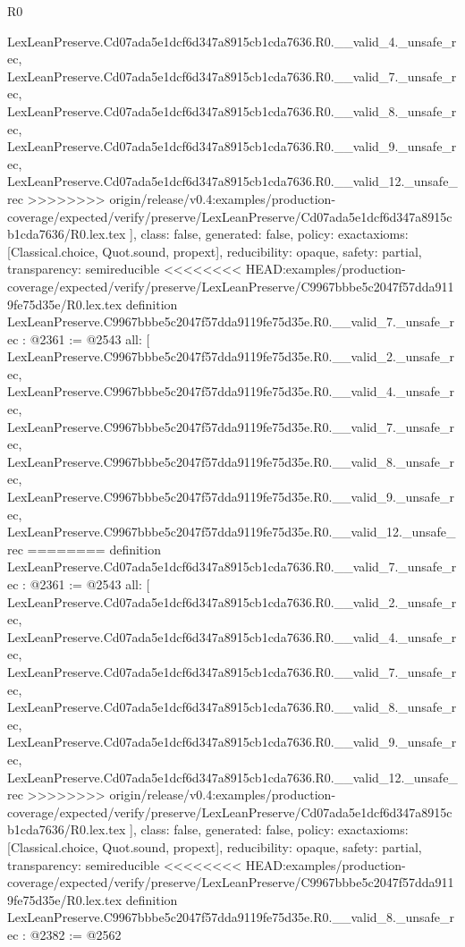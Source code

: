 \begin{lexlean}{R0}
\begin{coremodule}
{{{{{{{{{{{{{{{{{{{{{{{{{{{{{{{{{{{{{{{{{{{{{{{{{{{{    LexLeanPreserve.Cd07ada5e1dcf6d347a8915cb1cda7636.R0.__valid_4._unsafe_rec,
    LexLeanPreserve.Cd07ada5e1dcf6d347a8915cb1cda7636.R0.__valid_7._unsafe_rec,
    LexLeanPreserve.Cd07ada5e1dcf6d347a8915cb1cda7636.R0.__valid_8._unsafe_rec,
    LexLeanPreserve.Cd07ada5e1dcf6d347a8915cb1cda7636.R0.__valid_9._unsafe_rec,
    LexLeanPreserve.Cd07ada5e1dcf6d347a8915cb1cda7636.R0.__valid_12._unsafe_rec
>>>>>>>> origin/release/v0.4:examples/production-coverage/expected/verify/preserve/LexLeanPreserve/Cd07ada5e1dcf6d347a8915cb1cda7636/R0.lex.tex
  ],
  class: false,
  generated: false,
  policy: exact{axioms: [Classical.choice, Quot.sound, propext]},
  reducibility: opaque{},
  safety: partial,
  transparency: semireducible
}
<<<<<<<< HEAD:examples/production-coverage/expected/verify/preserve/LexLeanPreserve/C9967bbbe5c2047f57dda9119fe75d35e/R0.lex.tex
definition LexLeanPreserve.C9967bbbe5c2047f57dda9119fe75d35e.R0.__valid_7._unsafe_rec : @2361 := @2543 {
  all: [
    LexLeanPreserve.C9967bbbe5c2047f57dda9119fe75d35e.R0.__valid_2._unsafe_rec,
    LexLeanPreserve.C9967bbbe5c2047f57dda9119fe75d35e.R0.__valid_4._unsafe_rec,
    LexLeanPreserve.C9967bbbe5c2047f57dda9119fe75d35e.R0.__valid_7._unsafe_rec,
    LexLeanPreserve.C9967bbbe5c2047f57dda9119fe75d35e.R0.__valid_8._unsafe_rec,
    LexLeanPreserve.C9967bbbe5c2047f57dda9119fe75d35e.R0.__valid_9._unsafe_rec,
    LexLeanPreserve.C9967bbbe5c2047f57dda9119fe75d35e.R0.__valid_12._unsafe_rec
========
definition LexLeanPreserve.Cd07ada5e1dcf6d347a8915cb1cda7636.R0.__valid_7._unsafe_rec : @2361 := @2543 {
  all: [
    LexLeanPreserve.Cd07ada5e1dcf6d347a8915cb1cda7636.R0.__valid_2._unsafe_rec,
    LexLeanPreserve.Cd07ada5e1dcf6d347a8915cb1cda7636.R0.__valid_4._unsafe_rec,
    LexLeanPreserve.Cd07ada5e1dcf6d347a8915cb1cda7636.R0.__valid_7._unsafe_rec,
    LexLeanPreserve.Cd07ada5e1dcf6d347a8915cb1cda7636.R0.__valid_8._unsafe_rec,
    LexLeanPreserve.Cd07ada5e1dcf6d347a8915cb1cda7636.R0.__valid_9._unsafe_rec,
    LexLeanPreserve.Cd07ada5e1dcf6d347a8915cb1cda7636.R0.__valid_12._unsafe_rec
>>>>>>>> origin/release/v0.4:examples/production-coverage/expected/verify/preserve/LexLeanPreserve/Cd07ada5e1dcf6d347a8915cb1cda7636/R0.lex.tex
  ],
  class: false,
  generated: false,
  policy: exact{axioms: [Classical.choice, Quot.sound, propext]},
  reducibility: opaque{},
  safety: partial,
  transparency: semireducible
}
<<<<<<<< HEAD:examples/production-coverage/expected/verify/preserve/LexLeanPreserve/C9967bbbe5c2047f57dda9119fe75d35e/R0.lex.tex
definition LexLeanPreserve.C9967bbbe5c2047f57dda9119fe75d35e.R0.__valid_8._unsafe_rec : @2382 := @2562 {
}}}}}}}}}}}}}}}}}}}}}}}}}}}}}}}}}}}}}}}}}}}}}}}}}}}}}
\end{coremodule}
\end{lexlean}
